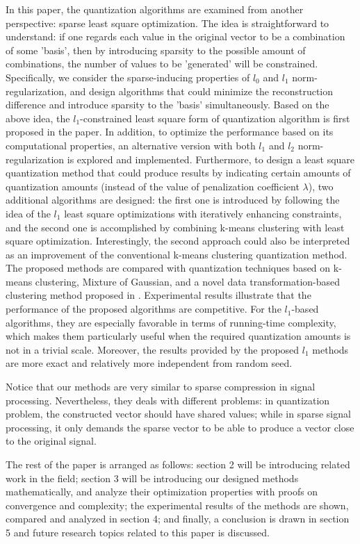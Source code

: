 \documentclass[preprint,10pt]{elsarticle}
\begin{document}
In this paper, the quantization algorithms are examined from another perspective: sparse least square optimization. The idea is straightforward to understand: if one regards each value in the original vector to be a combination of some 'basis', then by introducing sparsity to the possible amount of combinations, the number of values to be 'generated' will be constrained. Specifically, we consider the sparse-inducing properties of $l_0$ and $l_1$ norm-regularization, and design algorithms that could minimize the reconstruction difference and introduce sparsity to the 'basis' simultaneously. Based on the above idea, the $l_1$-constrained least square form of quantization algorithm is first proposed in the paper. In addition, to optimize the performance based on its computational properties, an alternative version with both $l_1$ and $l_2$ norm-regularization is explored and implemented. Furthermore, to design a least square quantization method that could produce results by indicating certain amounts of quantization amounts (instead of the value of penalization coefficient $\lambda$), two additional algorithms are designed: the first one is introduced by following the idea of the $l_1$ least square optimizations with iteratively enhancing constraints, and the second one is accomplished by combining k-means clustering with least square optimization. Interestingly, the second approach could also be interpreted as an improvement of the conventional k-means clustering quantization method. The proposed methods are compared with quantization techniques based on k-means clustering, Mixture of Gaussian, and a novel data transformation-based clustering method proposed in \cite{azimi2017novelClustering}. Experimental results illustrate that the performance of the proposed algorithms are competitive. For the $l_1$-based algorithms, they are especially favorable in terms of running-time complexity, which makes them particularly useful when the required quantization amounts is not in a trivial scale. Moreover, the results provided by the proposed $l_1$ methods are more exact and relatively more independent from random seed. \par 
Notice that our methods are very similar to sparse compression in signal processing\cite{SparseCompressionTypical}. Nevertheless, they deals with different problems: in quantization problem, the constructed vector should have shared values; while in sparse signal processing, it only demands the sparse vector to be able to produce a vector close to the original signal. \par
The rest of the paper is arranged as follows: section 2 will be introducing related work in the field; section 3 will be introducing our designed methods mathematically, and analyze their optimization properties with proofs on convergence and complexity; the experimental results of the methods are shown, compared and analyzed in section 4; and finally, a conclusion is drawn in section 5 and future research topics related to this paper is discussed. 
\end{document}
